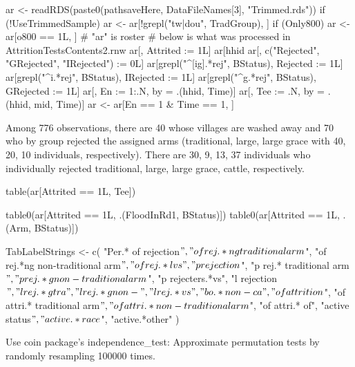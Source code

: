 \begin{Schunk}
\begin{Sinput}
ar <- readRDS(paste0(pathsaveHere, DataFileNames[3], "Trimmed.rds"))
if (!UseTrimmedSample) ar <- ar[!grepl("tw|dou", TradGroup), ]
if (Only800) ar <- ar[o800 == 1L, ]
# "ar" is roster
# below is what was processed in AttritionTestsContents2.rnw
ar[, Attrited := 1L]
ar[hhid %in% hhid[Time == 4], Attrited := 0L]
ar[, c("Rejected", "GRejected", "IRejected") := 0L]
ar[grepl("^[ig].*rej", BStatus), Rejected := 1L]
ar[grepl("^i.*rej", BStatus), IRejected := 1L]
ar[grepl("^g.*rej", BStatus), GRejected := 1L]
ar[, En := 1:.N, by = .(hhid, Time)]
ar[, Tee := .N, by = .(hhid, mid, Time)]
ar <- ar[En == 1 & Time == 1, ]
\end{Sinput}
\end{Schunk}
Among 776 observations, there are 40 whose villages are washed away and 70 who by group rejected the assigned arms (traditional, large, large grace with 40, 20, 10 individuals, respectively). There are 30, 9, 13, 37 individuals who individually rejected traditional, large, large grace, cattle, respectively. %
\begin{Schunk}
\begin{Sinput}
table(ar[Attrited == 1L, Tee])
\end{Sinput}
\end{Schunk}
\begin{Schunk}
\begin{Sinput}
table0(ar[Attrited == 1L, .(FloodInRd1, BStatus)])
table0(ar[Attrited == 1L, .(Arm, BStatus)])
\end{Sinput}
\end{Schunk}
\begin{Schunk}
\begin{Sinput}
TabLabelStrings <- 
c(
  "Per.* of rejection$", "of rej.*ng traditional arm$", "of rej.*ng non-traditional arm$", 
  "of rej.*l vs", "p rejection$", "p rej.* traditional arm$", 
  "p rej.*g non-traditional arm$", "p rejecters.*vs", "l rejection$", 
  "l rej.*g tra",  "l rej.*g non-", "l rej.*vs", 
  "bo.*non-ca", 
  "of attrition$", "of attri.* traditional arm$", 
  "of attri.* non-traditional arm$", "of attri.* of",
  "active status$", "active.*race$", "active.*other"
  )
\end{Sinput}
\end{Schunk}
Use \textsf{coin} package's \textsf{independence\_test}: Approximate permutation tests by randomly resampling 100000 times.


